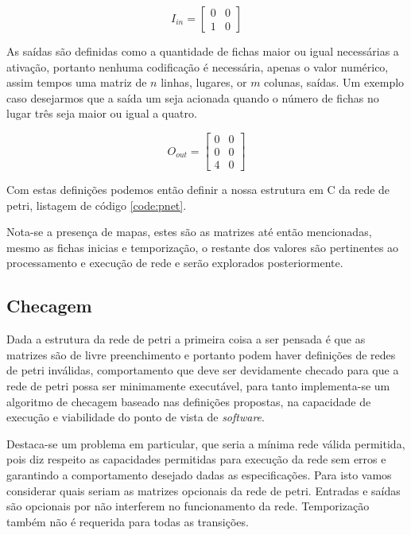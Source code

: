$$
I_{in} = 
\begin{bmatrix}
	0 & 0\\
	1 & 0
\end{bmatrix}
$$

As saídas são definidas como a quantidade de fichas maior ou igual necessárias a ativação, portanto nenhuma codificação é necessária, apenas o valor numérico, assim tempos uma matriz de $n$ linhas, lugares, or $m$ colunas, saídas. Um exemplo caso desejarmos que a saída um seja acionada quando o número de fichas no lugar três seja maior ou igual a quatro.

$$
O_{out} = 
\begin{bmatrix}
	0 & 0\\
	0 & 0\\
	4 & 0
\end{bmatrix}
$$

Com estas definições podemos então definir a nossa estrutura em C da rede de petri, listagem de código \ref{code:pnet}.



Nota-se a presença de mapas, estes são as matrizes até então mencionadas, mesmo as fichas inicias e temporização, o restante dos valores são pertinentes ao processamento e execução de rede e serão explorados posteriormente. 

\subsection{Checagem}

Dada a estrutura da rede de petri a primeira coisa a ser pensada é que as matrizes são de livre preenchimento e portanto podem haver definições de redes de petri inválidas, comportamento que deve ser devidamente checado para que a rede de petri possa ser minimamente executável, para tanto implementa-se um algoritmo de checagem baseado nas definições propostas, na capacidade de execução e viabilidade do ponto de vista de \textit{software}.

Destaca-se um problema em particular, que seria a mínima rede válida permitida, pois diz respeito as capacidades permitidas para execução da rede sem erros e garantindo a comportamento desejado dadas as especificações. Para isto vamos considerar quais seriam as matrizes opcionais da rede de petri. Entradas e saídas são opcionais por não interferem no funcionamento da rede. Temporização também não é requerida para todas as transições. 

